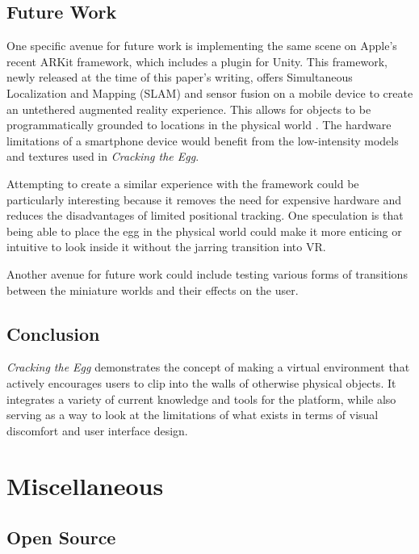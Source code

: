 \documentclass[10pt,twocolumn,letterpaper]{article}
\begin{document}
\subsection{Future Work}

One specific avenue for future work is implementing the same scene on Apple's recent ARKit framework, which includes a plugin for Unity. This framework, newly released at the time of this paper's writing, offers Simultaneous Localization and Mapping (SLAM) and sensor fusion on a mobile device to create an untethered augmented reality experience. This allows for objects to be programmatically grounded to locations in the physical world \cite{ARKit}. The hardware limitations of a smartphone device would benefit from the low-intensity models and textures used in \textit{Cracking the Egg}.

Attempting to create a similar experience with the framework could be particularly interesting because it removes the need for expensive hardware and reduces the disadvantages of limited positional tracking. One speculation is that being able to place the egg in the physical world could make it more enticing or intuitive to look inside it without the jarring transition into VR.

Another avenue for future work could include testing various forms of transitions between the miniature worlds and their effects on the user.

\subsection{Conclusion}

\textit{Cracking the Egg} demonstrates the concept of making a virtual environment that actively encourages users to clip into the walls of otherwise physical objects. It integrates a variety of current knowledge and tools for the platform, while also serving as a way to look at the limitations of what exists in terms of visual discomfort and user interface design.


\section{Miscellaneous}

\subsection{Open Source} \label{opensource}
\end{document}
